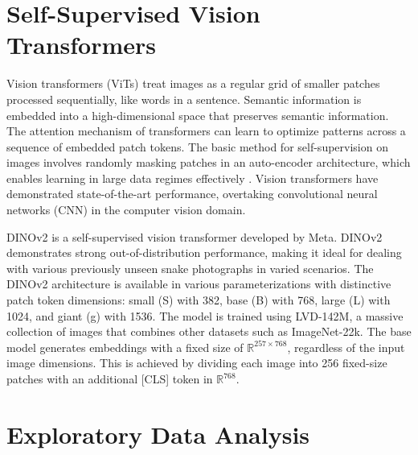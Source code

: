 \documentclass[]{ceurart}
\begin{document}
\section{Self-Supervised Vision Transformers}

Vision transformers (ViTs) treat images as a regular grid of smaller patches processed sequentially, like words in a sentence.
Semantic information is embedded into a high-dimensional space that preserves semantic information.
The attention mechanism of transformers can learn to optimize patterns across a sequence of embedded patch tokens. 
The basic method for self-supervision on images involves randomly masking patches in an auto-encoder architecture, which enables learning in large data regimes effectively \cite{he2022masked}.
Vision transformers have demonstrated state-of-the-art performance, overtaking convolutional neural networks (CNN) in the computer vision domain.

DINOv2 \cite{oquab2023dinov2} is a self-supervised vision transformer developed by Meta.
DINOv2 demonstrates strong out-of-distribution performance, making it ideal for dealing with various previously unseen snake photographs in varied scenarios.
The DINOv2 architecture is available in various parameterizations with distinctive patch token dimensions: small (S) with 382, base (B) with 768, large (L) with 1024, and giant (g) with 1536.
The model is trained using LVD-142M, a massive collection of images that combines other datasets such as ImageNet-22k.
The base model generates embeddings with a fixed size of $\mathbb{R}^{257 \times 768}$, regardless of the input image dimensions.
This is achieved by dividing each image into 256 fixed-size patches with an additional [CLS] token in $\mathbb{R}^{768}$.

\section{Exploratory Data Analysis}
\end{document}
